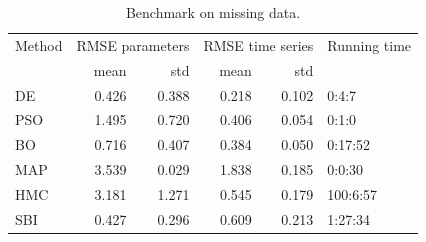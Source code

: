 \documentclass[preprint,11pt,authoryear]{elsarticle}
\begin{document}
\begin{table}[p]
    \centering
    \begin{tabular}{lrrrrl}
    {Method} & \multicolumn{2}{r}{RMSE parameters} & \multicolumn{2}{r}{RMSE time series} & Running time \\
    {} &            mean &       std &             mean & std \\
    \midrule
    DE & 0.426 & 0.388 & 0.218 & 0.102 & 0:4:7 \\
    PSO & 1.495 & 0.720 & 0.406 & 0.054 & 0:1:0 \\
    BO & 0.716 & 0.407 & 0.384 & 0.050 & 0:17:52 \\
    MAP & 3.539 & 0.029 & 1.838 & 0.185 & 0:0:30 \\
    HMC & 3.181 & 1.271 & 0.545 & 0.179 & 100:6:57 \\
    SBI & 0.427 & 0.296 & 0.609 & 0.213 & 1:27:34 \\
    \end{tabular}
\caption{Benchmark on missing data. }
\label{tab:Missingdata}
\end{table}






\clearpage
\newpage



\end{document}
